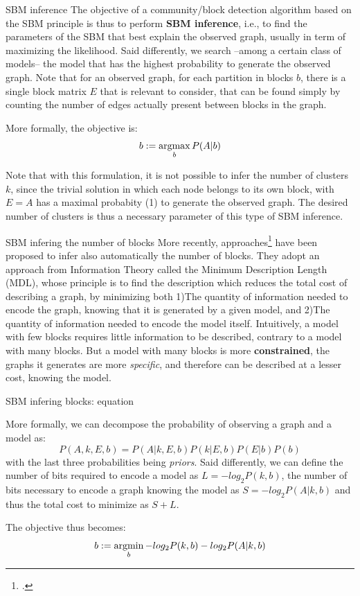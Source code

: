 \documentclass[a4paper,11pt]{book}
\begin{document}
\begin{textbox}{SBM inference}
The objective of a community/block detection algorithm based on the SBM principle is thus to perform \textbf{SBM inference}, i.e., to find the parameters of the SBM that best explain the observed graph, usually in term of maximizing the likelihood. Said differently, we search --among a certain class of models-- the model that has the highest probability to generate the observed graph. Note that for an observed graph, for each partition in blocks $b$, there is a single block matrix $E$ that is relevant to consider, that can be found simply by counting the number of edges actually present between blocks in the graph.  

More formally, the objective is:
\[
b:=\operatorname*{argmax}_{b} P(A|b)
\]

Note that with this formulation, it is not possible to infer the number of clusters $k$, since the trivial solution in which each node belongs to its own block, with $E=A$ has a maximal probabity (1) to generate the observed graph. The desired number of clusters is thus a necessary parameter of this type of SBM inference.
\end{textbox}






\begin{textbox}{SBM infering the number of blocks}
More recently, approaches\footcite{peixoto2019bayesian} have been proposed to infer also automatically the number of blocks. They adopt an approach from Information Theory called the Minimum Description Length (MDL), whose principle is to find the description which reduces the total cost of describing a graph, by minimizing both 1)The quantity of information needed to encode the graph, knowing that it is generated by a given model, and 2)The quantity of information needed to encode the model itself. Intuitively, a model with few blocks requires little information to be described, contrary to a model with many blocks. But a model with many blocks is more \textbf{constrained}, the graphs it generates are more \textit{specific}, and therefore can be described at a lesser cost, knowing the model.

\end{textbox}


\begin{textbox}{SBM infering blocks: equation}

More formally, we can decompose the probability of observing a graph and a model as:
\[
P (A, k, E, b) = P (A|k, E, b)P (k|E, b)P (E|b)P (b)
\]
with the last three probabilities being \textit{priors}.  Said differently, we can define the number of bits required to encode a model as $L = -log_2 P(k,b)$, the number of bits necessary to encode a graph knowing the model as $S = -log_2 P(A|k,b)$ and thus the total cost to minimize as $S+L$. 

The objective thus becomes:
\[
b:=\operatorname*{argmin}_{b} - log_2 P(k,b) - log_2 P(A|k,b)
\]

\end{textbox}
\end{document}
